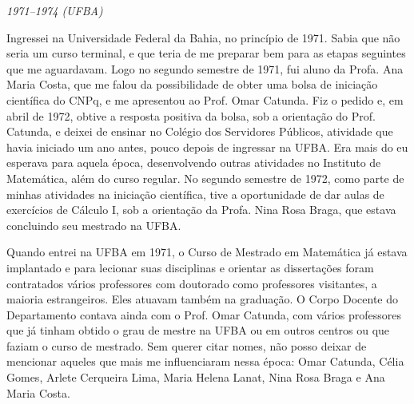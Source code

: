 \documentclass{hipatia}
\begin{document}
\begin{center}\emph{1971--1974 (UFBA)}\end{center}

Ingressei na Universidade Federal da Bahia, no princípio de
1971. Sabia que não seria um curso terminal, e que teria de
me preparar bem para as etapas seguintes que me aguardavam.
Logo no segundo semestre de 1971, fui aluno da Profa. Ana
Maria Costa, que me falou da possibilidade de obter uma
bolsa de iniciação científica do CNPq, e me apresentou ao
Prof. Omar Catunda. 
Fiz o pedido e, em abril de 1972, obtive a
resposta positiva da bolsa, sob a orientação do Prof.
Catunda, e deixei de ensinar no Colégio dos Servidores
Públicos, atividade que havia iniciado um ano antes, pouco
depois de ingressar na UFBA. 
Era mais do eu esperava para
aquela época, desenvolvendo outras atividades no Instituto
de Matemática, além do curso regular. No segundo semestre de
1972, como parte de minhas atividades na iniciação
científica, tive a oportunidade de dar aulas de exercícios
de Cálculo I, sob a orientação da Profa. Nina Rosa Braga,
que estava concluindo seu mestrado na UFBA.

Quando entrei na UFBA em 1971, o Curso de Mestrado em
Matemática já estava implantado e para lecionar suas
disciplinas e orientar as dissertações foram contratados
vários professores com doutorado como professores
visitantes, a maioria estrangeiros. Eles atuavam também na
graduação. O Corpo Docente do Departamento contava ainda com
o Prof. Omar Catunda, com vários professores que já tinham
obtido o grau de mestre na UFBA ou em outros centros ou que
faziam o curso de mestrado. Sem querer citar %
nomes, não
posso deixar de mencionar aqueles que mais me influenciaram
nessa época: Omar Catunda, Célia Gomes, Arlete Cerqueira
Lima, Maria Helena Lanat, Nina Rosa Braga e Ana Maria Costa.
\end{document}
